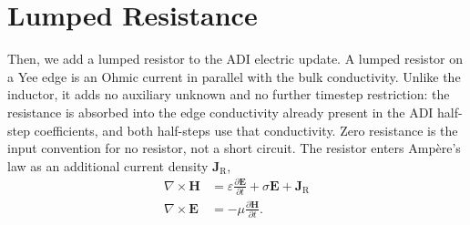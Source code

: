 \documentclass{article}
\numberwithin{equation}{section}
\numberwithin{figure}{section}
\begin{document}
\section{Lumped Resistance}

Then, we add a lumped resistor to the ADI electric update. A lumped resistor on a Yee edge is an Ohmic current in parallel with the bulk conductivity. Unlike the inductor, it adds no auxiliary unknown and no further timestep restriction: the resistance is absorbed into the edge conductivity already present in the ADI half-step coefficients, and both half-steps use that conductivity. Zero resistance is the input convention for no resistor, not a short circuit. The resistor enters Amp\`ere's law as an additional current density $\mathbf{J}_\mathrm{R}$,
\begin{subequations}\label{eq:maxwell-resistor}
    \begin{align}
        \nabla \times \mathbf{H} & = \varepsilon \frac{\partial \mathbf{E}}{\partial t} + \sigma \mathbf{E} + \mathbf{J}_\mathrm{R}
        \label{eq:maxwell-ampere-resistor}                                                                                          \\
        \nabla \times \mathbf{E} & = -\mu \frac{\partial \mathbf{H}}{\partial t}.
        \label{eq:maxwell-faraday-resistor}
    \end{align}
\end{subequations}
\end{document}
